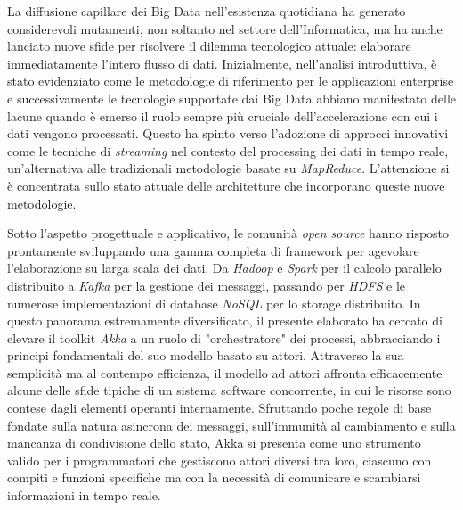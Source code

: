 La diffusione capillare dei Big Data nell'esistenza quotidiana ha generato considerevoli mutamenti, non soltanto nel settore dell'Informatica, ma ha anche lanciato nuove sfide per risolvere il dilemma tecnologico attuale: elaborare immediatamente l'intero flusso di dati.
Inizialmente, nell'analisi introduttiva, è stato evidenziato come le metodologie di riferimento per le applicazioni enterprise e successivamente le tecnologie supportate dai Big Data abbiano manifestato delle lacune quando è emerso il ruolo sempre più cruciale dell'accelerazione con cui i dati vengono processati.
Questo ha spinto verso l'adozione di approcci innovativi come le tecniche di \textit{streaming} nel contesto del processing dei dati in tempo reale, un'alternativa alle tradizionali metodologie basate su \textit{MapReduce}.
L'attenzione si è concentrata sullo stato attuale delle architetture che incorporano queste nuove metodologie.

Sotto l'aspetto progettuale e applicativo, le comunità \textit{open source} hanno risposto prontamente sviluppando una gamma completa di framework per agevolare l'elaborazione su larga scala dei dati. Da \textit{Hadoop} e \textit{Spark} per il calcolo parallelo distribuito a \textit{Kafka} per la gestione dei messaggi, passando per \textit{HDFS} e le numerose implementazioni di database \textit{NoSQL} per lo storage distribuito.
In questo panorama estremamente diversificato, il presente elaborato ha cercato di elevare il toolkit \textit{Akka} a un ruolo di "orchestratore" dei processi, abbracciando i principi fondamentali del suo modello basato su attori.
Attraverso la sua semplicità ma al contempo efficienza, il modello ad attori affronta efficacemente alcune delle sfide tipiche di un sistema software concorrente, in cui le risorse sono contese dagli elementi operanti internamente.
Sfruttando poche regole di base fondate sulla natura asincrona dei messaggi, sull'immunità al cambiamento e sulla mancanza di condivisione dello stato, Akka si presenta come uno strumento valido per i programmatori che gestiscono attori diversi tra loro, ciascuno con compiti e funzioni specifiche ma con la necessità di comunicare e scambiarsi informazioni in tempo reale.

